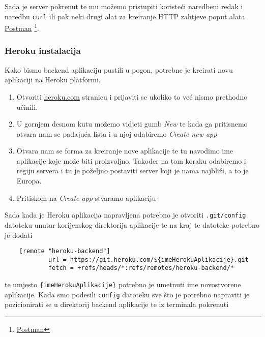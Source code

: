 								Sada je server pokrenut te mu možemo pristupiti koristeći naredbeni redak i naredbu \texttt{curl} ili pak neki drugi alat za kreiranje HTTP zahtjeve poput alata \underline{Postman} \footnote{\href{https://www.postman.com/}{Postman}}.
		             
						\pagebreak
		    
						\subsubsection*{Heroku instalacija}
	        
								Kako bismo backend aplikaciju pustili u pogon, potrebne je kreirati novu aplikaciji na Heroku platformi.
								
								\begin{enumerate}
									\item Otvoriti \href{https://dashboard.heroku.com/apps}{heroku.com} stranicu i prijaviti se ukoliko to već nismo prethodno učinili.
									\item U gornjem desnom kutu možemo vidjeti gumb \textit{New} te kada ga pritisnemo otvara nam se padajuća lista i u njoj odabiremo \textit{Create new app}
									\item Otvara nam se forma za kreiranje nove aplikacije te tu navodimo ime aplikacije koje može biti proizvoljno. Također na tom koraku odabiremo i regiju servera i tu je poželjno postaviti server koji je nama najbliži, a to je Europa.
									\item Pritiskom na \textit{Create app} stvaramo aplikaciju
		        		\end{enumerate}
		        
		        		Sada kada je Heroku aplikacija napravljena potrebno je otvoriti \texttt{.git/config} datoteku unutar korijenskog direktorija aplikacije te na kraj te datoteke potrebno je dodati

                \begin{verbatim}
    [remote "heroku-backend"]
        	url = https://git.heroku.com/${imeHerokuAplikacije}.git
        	fetch = +refs/heads/*:refs/remotes/heroku-backend/*
								\end{verbatim}
								
								te umjesto \texttt{\{imeHerokuAplikacije\}} potrebno je umetnuti ime novostvorene aplikacije. Kada smo podesili \texttt{config} datoteku sve što je potrebno napraviti je pozicionirati se u direktorij backend aplikacije te iz terminala pokrenuti 

